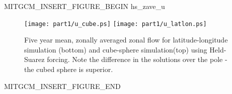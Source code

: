 \begin{rawhtml}MITGCM_INSERT_FIGURE_BEGIN hs_zave_u\end{rawhtml}
\begin{figure}
 \begin{center}
   \texttt{[image: part1/u\_cube.ps]}
   \texttt{[image: part1/u\_latlon.ps]}
 \end{center}
\caption{
Five year mean, zonally averaged zonal flow for
latitude-longitude simulation (bottom) and cube-sphere simulation(top) using
Held-Suarez forcing. Note the difference in the solutions over the pole -
the cubed sphere is superior.
}
\label{fig:hs_zave_u}
\end{figure}
\begin{rawhtml}MITGCM_INSERT_FIGURE_END \end{rawhtml}
